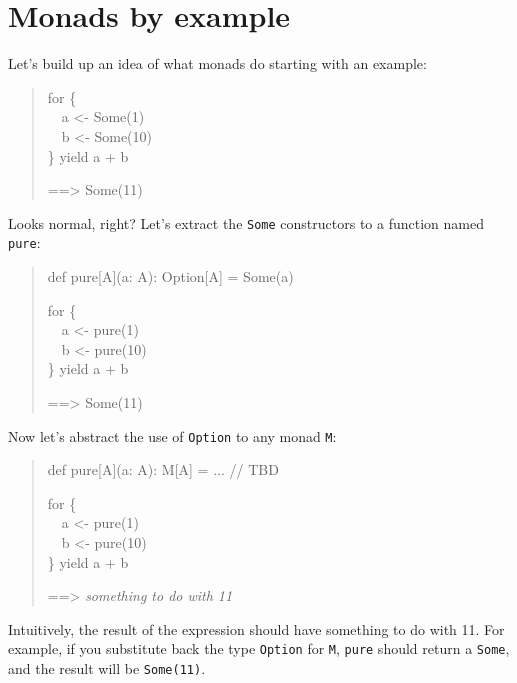 \documentclass{tufte-handout}
\begin{document}
\section{Monads by example}\label{sec:example}

Let's build up an idea of what monads do starting with an example:

\begin{quote} \ttfamily
for \{ \\
\ \ a <- Some(1) \\
\ \ b <- Some(10) \\
\} yield a + b

==> Some(11)
\end{quote}

Looks normal, right? Let's extract the \texttt{Some} constructors to a function named \texttt{pure}:

\begin{quote} \ttfamily
def pure[A](a: A): Option[A] = Some(a)

for \{ \\
\ \ a <- pure(1) \\
\ \ b <- pure(10) \\
\} yield a + b

==> Some(11)
\end{quote}

Now let's abstract the use of \texttt{Option} to any monad \texttt{M}:

\begin{quote} \ttfamily
def pure[A](a: A): M[A] = ... // TBD

for \{ \\
\ \ a <- pure(1) \\
\ \ b <- pure(10) \\
\} yield a + b

==> \textit{something to do with 11}
\end{quote}

Intuitively, the result of the expression should have something to do with 11.
For example, if you substitute back the type \texttt{Option} for \texttt{M}, \texttt{pure} should return a \texttt{Some},
and the result will be \texttt{Some(11)}.




\end{document}

